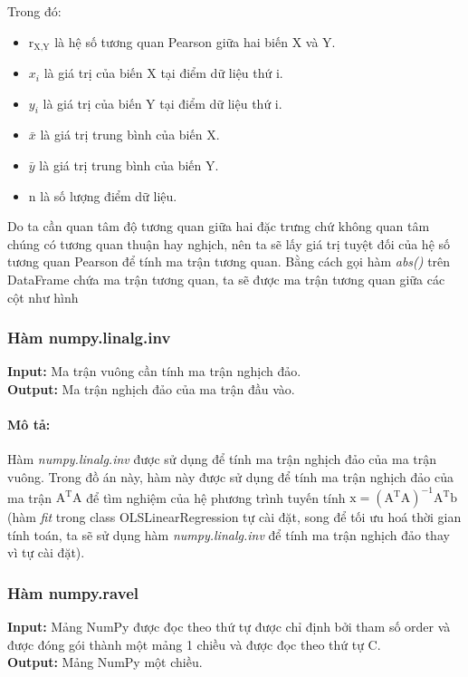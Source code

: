 \documentclass[]{article}
\begin{document}
Trong đó:
\begin{itemize}
    \item $\text{r}_{\text{X,Y}}$ là hệ số tương quan Pearson giữa hai biến X và Y.
    \item $x_i$ là giá trị của biến X tại điểm dữ liệu thứ i.
    \item $y_i$ là giá trị của biến Y tại điểm dữ liệu thứ i.
    \item $\bar{x}$ là giá trị trung bình của biến X.
    \item $\bar{y}$ là giá trị trung bình của biến Y.
    \item n là số lượng điểm dữ liệu.
\end{itemize}

Do ta cần quan tâm độ tương quan giữa hai đặc trưng chứ không quan tâm chúng có tương quan thuận hay nghịch, nên ta sẽ lấy giá trị tuyệt đối của hệ số tương quan Pearson để tính ma trận tương quan. Bằng cách gọi hàm \textit{abs()} trên DataFrame chứa ma trận tương quan, ta sẽ được ma trận tương quan giữa các cột như hình 

\subsubsection{Hàm numpy.linalg.inv}
\noindent
\textbf{Input:} Ma trận vuông cần tính ma trận nghịch đảo. \\
\textbf{Output:} Ma trận nghịch đảo của ma trận đầu vào.
\paragraph{Mô tả:}

Hàm \textit{numpy.linalg.inv} \cite{numpyNumpylinalginv} được sử dụng để tính ma trận nghịch đảo của ma trận vuông. Trong đồ án này, hàm này được sử dụng để tính ma trận nghịch đảo của ma trận $\text{A}^\text{T} \text{A}$ để tìm nghiệm của hệ phương trình tuyến tính $\text{x} = (\text{A}^\text{T} \text{A})^{-1} \text{A}^\text{T} \text{b}$ (hàm \textit{fit} trong class OLSLinearRegression tự cài đặt, song để tối ưu hoá thời gian tính toán, ta sẽ sử dụng hàm \textit{numpy.linalg.inv} để tính ma trận nghịch đảo thay vì tự cài đặt).

\subsubsection{Hàm numpy.ravel} \label{ravel}
\noindent
\textbf{Input:} Mảng NumPy được đọc theo thứ tự được chỉ định bởi tham số order và được đóng gói thành một mảng 1 chiều và được đọc theo thứ tự C. \\
\textbf{Output:} Mảng NumPy một chiều.
\end{document}
